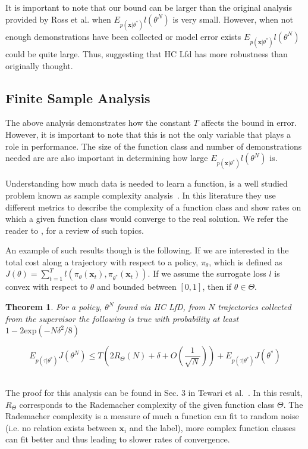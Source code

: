 \documentclass[10pt, conference]{ieeeconf}      %
\newtheorem{theorem}{Theorem}[section]
\newcommand{\bx}{\mathbf{x}}
\begin{document}
It is important to note that our bound can be larger than the original analysis provided by Ross et al. when  $E_{p(\bx|\theta^*)} l(\theta^N)$ is very small. However, when not enough demonstrations have been collected or model error exists $E_{p(\bx|\theta^*)} l(\theta^N)$ could be quite large. Thus, suggesting that HC Lfd has more robustness than originally thought. 

\subsection{Finite Sample Analysis}
The above analysis demonstrates how the constant $T$ affects the bound in error. However, it is important to note that this is not the only variable that plays a role in performance. The size of the function class and number of demonstrations needed are are also important in determining how large $E_{p(\bx|\theta^*)} l(\theta^N)$ is. 

Understanding how much data is needed to learn a function, is a well studied problem known as sample complexity analysis~\cite{anthony2009neural}. In this literature they use different metrics to describe the complexity of a function class and show rates on which a given function class would converge to the real solution. We refer the reader to \cite{vapnik2013nature}, for a review of such topics. 

An example of such results though is the following.  If we are interested in the total cost along a trajectory with respect to a policy, $\pi_{\theta}$, which is defined as $J(\theta) = \sum^T_{t=1} l(\pi_{\theta}(\bx_{t}),\pi_{\theta^*}(\bx_{t}))$.  If we assume the surrogate loss $l$ is convex with respect to $\theta$ and bounded between $[0,1]$, then if $\theta \in \Theta$. \\

\begin{theorem}\label{thm:sup}
For a policy, $\theta^N$ found via HC LfD, from $N$ trajectories collected from the supervisor the following is true with probability at least $1- 2\mbox{exp} (-N\delta^2/8)$

$$E_{p(\tau|\theta^*)} J(\theta^N)\leq T( 2R_{\Theta}(N) + \delta+ O(\frac{1}{\sqrt{N}})) + E_{p(\tau|\theta^*)} J(\theta^*)$$\\

\end{theorem}

The proof for this analysis can be found in Sec. 3 in Tewari et al.~\cite{tewari13learning}. In this result, $R_{\Theta}$ corresponds to the Rademacher complexity of the given function class $\Theta$. The Rademacher complexity is a measure of much a function can fit to random noise (i.e. no relation exists between $\bx_i$ and the label), more complex function classes can fit better and thus leading to slower rates of convergence.
\end{document}
